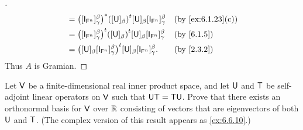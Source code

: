 \begin{proof}[]
\begin{align*}
      & = \pa{[\IT[\vs{F}^n]]_{\gamma}^{\beta}}^* \tp{([\U]_{\beta})} [\U]_{\beta} [\IT[\vs{F}^n]]_{\gamma}^{\beta}    &  & \by{ex:6.1.23}[c]             \\
      & = \tp{\pa{[\IT[\vs{F}^n]]_{\gamma}^{\beta}}} \tp{([\U]_{\beta})} [\U]_{\beta} [\IT[\vs{F}^n]]_{\gamma}^{\beta} &  & \by{6.1.5}                    \\
      & = \tp{\pa{[\U]_{\beta} [\IT[\vs{F}^n]]_{\gamma}^{\beta}}} [\U]_{\beta} [\IT[\vs{F}^n]]_{\gamma}^{\beta}.       &  & \by{2.3.2}
  \end{align*}
  Thus \(A\) is Gramian.
\end{proof}

\begin{ex}\label{ex:6.4.14}
  Let \(\mathsf{V}\) be a finite-dimensional real inner product space, and let \(\mathsf{U}\) and \(\mathsf{T}\) be self-adjoint linear operators on \(\mathsf{V}\) such that \(\mathsf{U} \mathsf{T} = \mathsf{T} \mathsf{U}\).
  Prove that there exists an orthonormal basis for \(\mathsf{V}\) over \(\mathbb{R}\) consisting of vectors that are eigenvectors of both \(\mathsf{U}\) and \(\mathsf{T}\).
  (The complex version of this result appears as \cref{ex:6.6.10}.)
\end{ex}

